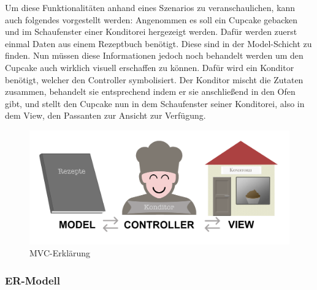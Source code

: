 Um diese Funktionalitäten anhand eines Szenarios zu veranschaulichen, kann auch folgendes vorgestellt werden:
Angenommen es soll ein Cupcake gebacken und im Schaufenster einer Konditorei hergezeigt werden. Dafür werden zuerst einmal Daten aus einem Rezeptbuch benötigt. Diese sind in der Model-Schicht zu finden.
Nun müssen diese Informationen jedoch noch behandelt werden um den Cupcake auch wirklich visuell erschaffen zu können. Dafür wird ein Konditor benötigt, welcher den Controller symbolisiert.
Der Konditor mischt die Zutaten zusammen, behandelt sie entsprechend indem er sie anschließend in den Ofen gibt, und stellt den Cupcake nun in dem Schaufenster seiner Konditorei, also in dem View, den Passanten zur Ansicht zur Verfügung.
			\begin{figure}[H]
			\begin{centering}
			\includegraphics[width = 1\textwidth]{Bilder/Jok_mvc.png}
			\par\end{centering}
			\caption{MVC-Erklärung}
			\label{MVC-Erklärung}
			\end{figure}

    \subsubsection{ER-Modell}

